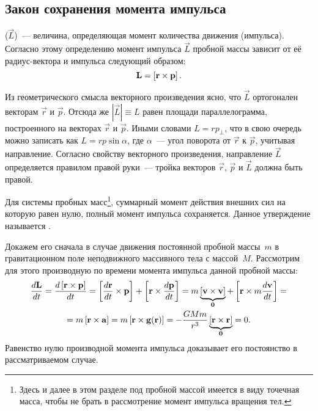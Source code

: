 \subsection{Закон сохранения момента импульса}
 ($\vec{L}$)~---  величина, определяющая момент количества движения (импульса). Согласно этому определению момент импульса $\vec{L}$ пробной массы зависит от её радиус-вектора и импульса следующий образом:
\begin{equation}
    \mathbf{L} = \left[\mathbf{r} \times \mathbf{p}\right].
\end{equation}

Из геометрического смысла векторного произведения ясно, что $\vec{L}$ ортогонален векторам $\vec{r}$ и $\vec{p}$. Отсюда же $|\vec{L}| \equiv L$ равен площади параллелограмма, построенного на векторах $\vec{r}$ и $\vec p$. Иными словами $L = rp_\perp$, что в свою очередь можно записать как $ L = r p \sin \alpha$, где $\alpha$~--- угол поворота от $\vec{r}$ к $\vec p$, учитывая направление. Согласно свойству векторного произведения, направление $\vec L$ определяется правилом правой руки~--- тройка векторов $\vec r$, $\vec p$ и $\vec L$ должна быть правой.

Для системы пробных масс\footnote{Здесь и далее в этом разделе под пробной массой имеется в виду точечная масса, чтобы не брать в рассмотрение момент импульса вращения тел.}, суммарный момент действия внешних сил на которую равен нулю, полный момент импульса сохраняется. Данное утверждение называется .

Докажем его сначала в случае движения постоянной пробной массы~$m$ в гравитационном поле неподвижного массивного тела с массой~$M$. Рассмотрим для этого производную по времени момента импульса данной пробной массы:
\begin{multline}
    \frac{d\mathbf{L}}{dt} = \frac{d\left[\mathbf{r} \times \mathbf{p}\right]}{dt} = \left[ \frac{d \mathbf{r}}{dt} \times \mathbf{p} \right] + \left[\mathbf{r} \times \frac{d\mathbf{p}}{dt} \right] = m \underbrace{\left[\mathbf{v} \times \mathbf{v}\right]}_{\mathbf{0}} + \left[\mathbf{r} \times m \frac{d\mathbf{v}}{dt} \right] = \\
    = m \left[\mathbf{r} \times \mathbf{a}\right] = m \left[\mathbf{r} \times \mathbf{g(r)}\right] =  -\frac{G M m}{r^3} \underbrace{ \left[\mathbf{r} \times \mathbf{r}\right]}_{\mathbf{0}} = 0.
\end{multline}
Равенство нулю производной момента импульса доказывает его постоянство в рассматриваемом случае.

